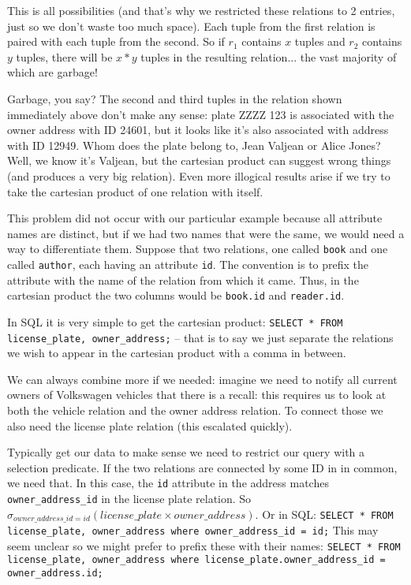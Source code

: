 This is all possibilities (and that's why we restricted these relations to 2 entries, just so we don't waste too much space). Each tuple from the first relation is paired with each tuple from the second. So if $r_{1}$ contains $x$ tuples and $r_{2}$ contains $y$ tuples, there will be $x*y$ tuples in the resulting relation... the vast majority of which are garbage! 

Garbage, you say? The second and third tuples in the relation shown immediately above don't make any sense: plate ZZZZ 123 is associated with the owner address with ID 24601, but it looks like it's also associated with address with ID 12949. Whom does the plate belong to, Jean Valjean or Alice Jones? Well, we know it's Valjean, but the cartesian product can suggest wrong things (and produces a very big relation). Even more illogical results arise if we try to take the cartesian product of one relation with itself.

This problem did not occur with our particular example because all attribute names are distinct, but if we had two names that were the same, we would need a way to differentiate them. Suppose that two relations, one called \texttt{book} and one called \texttt{author}, each having an attribute \texttt{id}. The convention is to prefix the attribute with the name of the relation from which it came. Thus, in the cartesian product the two columns would be \texttt{book.id} and \texttt{reader.id}.

In SQL it is very simple to get the cartesian product: \texttt{SELECT * FROM license\_plate, owner\_address;} -- that is to say we just separate the relations we wish to appear in the cartesian product with a comma in between.

We can always combine more if we needed: imagine we need to notify all current owners of Volkswagen vehicles that there is a recall: this requires us to look at both the vehicle relation and the owner address relation. To connect those we also need the license plate relation (this escalated quickly).

Typically get our data to make sense we need to restrict our query with a selection predicate. If the two relations are connected by some ID in in common, we need that. In this case, the \texttt{id} attribute in the address matches \texttt{owner\_address\_id} in the license plate relation. So $\sigma_{owner\_address\_id = id}( license\_plate \times owner\_address )$. Or in SQL: \texttt{SELECT * FROM license\_plate, owner\_address where owner\_address\_id = id;} This may seem unclear so we might prefer to prefix these with their names: \texttt{SELECT * FROM license\_plate, owner\_address where license\_plate.owner\_address\_id = owner\_address.id;} 

